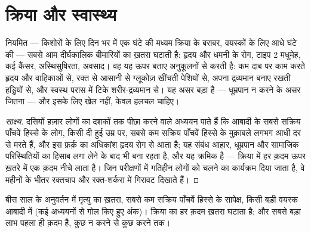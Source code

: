 \section{क्रिया और स्वास्थ्य}

\begin{proposition}[नियमित क्रिया का स्वास्थ्य पर असर]\label{prop:g10:sport-and-health:health}
नियमित  --- किशोरों के लिए दिन भर में एक घंटे की मध्यम
क्रिया के बराबर, वयस्कों के लिए आधे घंटे की --- सबसे आम दीर्घकालिक
बीमारियों का ख़तरा घटाती है: हृदय और धमनी के रोग, टाइप 2 मधुमेह, कई
कैंसर, अस्थिसुषिरता, अवसाद। वह यह ऊपर बताए अनुकूलनों से करती है: कम दाब पर
काम करते हृदय और वाहिकाओं से, रक्त से आसानी से ग्लूकोज़ खींचती पेशियों से,
अपना द्रव्यमान बनाए रखती हड्डियों से, और स्वस्थ परास में टिके
शरीर-द्रव्यमान से। यह असर बड़ा है --- धूम्रपान न करने के असर जितना --- और
इसके लिए खेल नहीं, केवल हलचल चाहिए।
\end{proposition}
\begin{proof}[साक्ष्य]
दसियों हज़ार लोगों का दशकों तक पीछा करने वाले अध्ययन पाते हैं कि आबादी के
सबसे सक्रिय पाँचवें हिस्से के लोग, किसी दी हुई उम्र पर, सबसे कम सक्रिय
पाँचवें हिस्से के मुक़ाबले लगभग आधी दर से मरते हैं, और इस फ़र्क़ का
अधिकांश हृदय रोग से आता है; यह संबंध आहार, धूम्रपान और सामाजिक परिस्थितियों
का हिसाब लगा लेने के बाद भी बना रहता है, और यह क्रमिक है --- क्रिया में हर
क़दम ऊपर ख़तरे में एक क़दम नीचे लाता है। जिन परीक्षणों में गतिहीन लोगों को
चलने का कार्यक्रम दिया जाता है, वे महीनों के भीतर रक्तचाप और रक्त-शर्करा
में गिरावट दिखाते हैं।
\end{proof}

\begin{omfigure}

{\small बीस साल के अनुवर्तन में मृत्यु का ख़तरा, सबसे कम सक्रिय पाँचवें
हिस्से के सापेक्ष, किसी बड़ी वयस्क आबादी में (कई अध्ययनों से गोल किए हुए
अंक)। क्रिया का हर क़दम ख़तरा घटाता है; और सबसे बड़ा लाभ पहला ही क़दम है,
कुछ न करने से कुछ करने तक।}
\end{omfigure}

